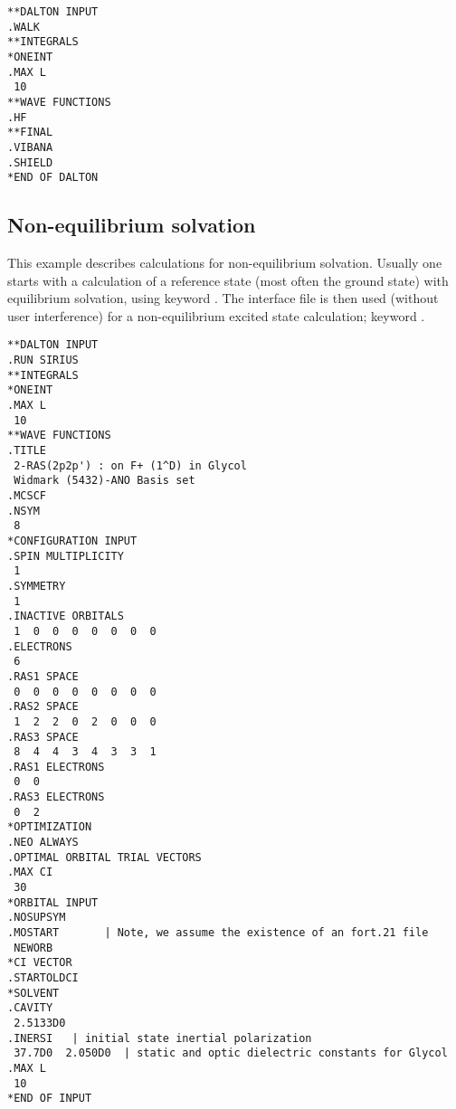 \begin{verbatim}
**DALTON INPUT
.WALK
**INTEGRALS
*ONEINT
.MAX L
 10
**WAVE FUNCTIONS
.HF
**FINAL
.VIBANA
.SHIELD
*END OF DALTON
\end{verbatim}


\subsection{Non-equilibrium solvation}

This example describes calculations for non-equilibrium
solvation.
Usually one starts with a calculation of a reference state
(most often the ground state) with equilibrium solvation, using
keyword . The interface file is then
used (without user interference) for
a non-equilibrium excited state calculation; keyword
.

\begin{verbatim}
**DALTON INPUT
.RUN SIRIUS
**INTEGRALS
*ONEINT
.MAX L
 10
**WAVE FUNCTIONS
.TITLE
 2-RAS(2p2p') : on F+ (1^D) in Glycol
 Widmark (5432)-ANO Basis set
.MCSCF
.NSYM
 8
*CONFIGURATION INPUT
.SPIN MULTIPLICITY
 1
.SYMMETRY
 1
.INACTIVE ORBITALS
 1  0  0  0  0  0  0  0
.ELECTRONS
 6
.RAS1 SPACE
 0  0  0  0  0  0  0  0
.RAS2 SPACE
 1  2  2  0  2  0  0  0
.RAS3 SPACE
 8  4  4  3  4  3  3  1
.RAS1 ELECTRONS
 0  0
.RAS3 ELECTRONS
 0  2
*OPTIMIZATION
.NEO ALWAYS
.OPTIMAL ORBITAL TRIAL VECTORS
.MAX CI
 30
*ORBITAL INPUT
.NOSUPSYM
.MOSTART       | Note, we assume the existence of an fort.21 file
 NEWORB
*CI VECTOR
.STARTOLDCI
*SOLVENT
.CAVITY
 2.5133D0
.INERSI   | initial state inertial polarization
 37.7D0  2.050D0  | static and optic dielectric constants for Glycol
.MAX L
 10
*END OF INPUT
\end{verbatim}
